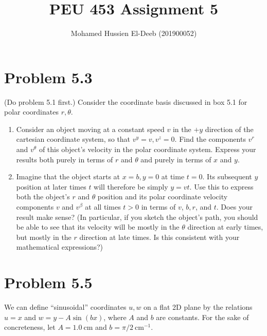 \documentclass[12pt]{article}
\title{PEU 453 Assignment 5}
\author{Mohamed Hussien El-Deeb (201900052)}
\date{}
\begin{document}
\maketitle
\tableofcontents

\renewcommand{\labelenumi}{\textbf{\alph{enumi}.}}

\newpage

\section{Problem 5.3}

 (Do problem 5.1 first.) Consider the coordinate basis discussed in box 5.1 for polar coordinates \(r, \theta \).

\begin{enumerate}
      \item Consider an object moving at a constant speed \(v\) in the \(+y\) direction of the cartesian coordinate system, so that \(v^y=v, v^z=0\). Find the components \(v^r\) and \(v^\theta \) of this object's velocity in the polar coordinate system. Express your results both purely in terms of \(r\) and \(\theta \) and purely in terms of \(x\) and \(y\).
      \item Imagine that the object starts at \(x=b, y=0\) at time \(t=0\). Its subsequent \(y\) position at later times \(t\) will therefore be simply \(y=v t\). Use this to express both the object's \(r\) and \(\theta \) position and its polar coordinate velocity components \(v\) and \(v^\beta \) at all times \(t>0\) in terms of \(v\), \(b, r\), and \(t\). Does your result make sense? (In particular, if you sketch the object's path, you should be able to see that its velocity will be mostly in the \(\theta \) direction at early times, but mostly in the \(r\) direction at late times. Is this consistent with your mathematical expressions?)
\end{enumerate}

\newpage

\section{Problem 5.5}

We can define ``sinusoidal'' coordinates \(u, w\) on a flat 2D plane by the relations \(u=x\) and \(w=y-A \sin (b x)\), where \(A\) and \(b\) are constants. For the sake of concreteness, let \(A=1.0 \mathrm{~cm}\) and \(b=\pi / 2 \mathrm{~cm}^{-1}\).
\end{document}
